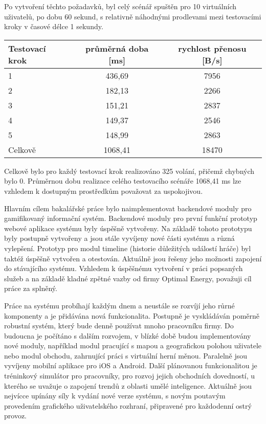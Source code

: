 \documentclass[twoside, 12pt]{article}
\begin{document}
{{\clearpage

Po vytvoření těchto požadavků, byl celý scénář spuštěn pro 10 virtuálních uživatelů,
po dobu 60 sekund, s relativně náhodnými prodlevami mezi testovacími kroky v časové délce 1 sekundy.

\vspace{10}


\def\arraystretch{1.2}
\begin{tabular}{|l|c|c|}
\hline
\textbf{Testovací krok} & \textbf{průměrná doba [ms]} & \textbf{rychlost přenosu [B/s]} \\
\hline
1 & 436,69 & 7956 \\
\hline
2 & 182,13 & 2266 \\
\hline
3 & 151,21 & 2837 \\
\hline
4 & 149,37 & 2546 \\
\hline
5 & 148,99 & 2863 \\
\hline
Celkově & 1068,41 & 18470 \\
\hline
\end{tabular}
\endtab

Celkově bylo pro každý testovací krok realizováno 325 volání, přičemž chybných bylo 0.
Průměrnou dobu realizace celého testovacího scénáře 1068,41 ms lze vzhledem k dostupným prostředkům
považovat za uspokojivou.

Hlavním cílem bakalářské práce bylo naimplementovat backendové moduly pro gamifikovaný informační systém.
Backendové moduly pro první funkční prototyp webové aplikace systému byly
úspěšně vytvořeny.
Na základě tohoto prototypu byly postupně vytvořeny
a jsou stále vyvíjeny nové části systému a různá vylepšení.
Prototyp pro modul timeline (historie důležitých událostí hráče) byl taktéž úspěšně vytvořen
a otestován. Aktuálně jsou řešeny jeho možnosti zapojení do stávajícího systému.
Vzhledem k úspěšnému vytvoření v práci popsaných služeb a na základě kladné zpětné vazby od firmy Optimal Energy,
považuji cíl práce za splněný.


Práce na systému probíhají každým dnem a neustále se rozvíjí jeho růrné komponenty a je přidávána nová funkcionalita.
Postupně je vyskládáván poměrně robustní systém, který bude denně používat mnoho pracovníku firmy.
Do budoucna je počítáno s dalším rozvojem, v blízké době budou implementovány nové moduly,
například modul pracující s mapou a geografickou polohou uživatele nebo modul obchodu, zahrnující práci s virtuální herní měnou.
Paralelně jsou vyvíjeny mobilní aplikace pro iOS a Android.
Další plánovanou funkcionalitou je tréninkový simulátor pro pracovníky, pro rozvoj jejich obchodních dovedností,
u kterého se uvažuje o zapojení trendů z oblasti umělé inteligence.
Aktuálně jsou nejvícce upínány síly k vydání nové verze systému, s novým poutavým provedením grafického uživatelského rozhraní,
připravené pro každodenní ostrý provoz.


}}
\end{document}
